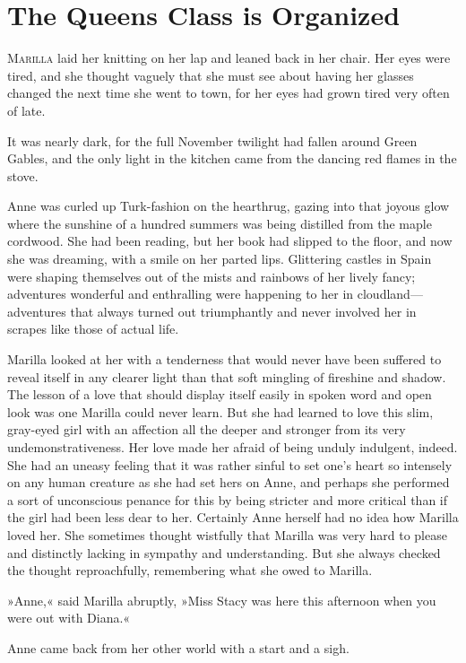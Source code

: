 \chapter{The Queens Class is Organized}

\lettrine[lines=4]{M}{arilla} laid her knitting on her lap and leaned back in her chair. Her eyes were tired, and she thought vaguely that she must see about having her glasses changed the next time she went to town, for her eyes had grown tired very often of late.

It was nearly dark, for the full November twilight had fallen around Green Gables, and the only light in the kitchen came from the dancing red flames in the stove.

Anne was curled up Turk-fashion on the hearthrug, gazing into that joyous glow where the sunshine of a hundred summers was being distilled from the maple cordwood. She had been reading, but her book had slipped to the floor, and now she was dreaming, with a smile on her parted lips. Glittering castles in Spain were shaping themselves out of the mists and rainbows of her lively fancy; adventures wonderful and enthralling were happening to her in cloudland—adventures that always turned out triumphantly and never involved her in scrapes like those of actual life.

Marilla looked at her with a tenderness that would never have been suffered to reveal itself in any clearer light than that soft mingling of fireshine and shadow. The lesson of a love that should display itself easily in spoken word and open look was one Marilla could never learn. But she had learned to love this slim, gray-eyed girl with an affection all the deeper and stronger from its very undemonstrativeness. Her love made her afraid of being unduly indulgent, indeed. She had an uneasy feeling that it was rather sinful to set one’s heart so intensely on any human creature as she had set hers on Anne, and perhaps she performed a sort of unconscious penance for this by being stricter and more critical than if the girl had been less dear to her. Certainly Anne herself had no idea how Marilla loved her. She sometimes thought wistfully that Marilla was very hard to please and distinctly lacking in sympathy and understanding. But she always checked the thought reproachfully, remembering what she owed to Marilla.

»Anne,« said Marilla abruptly, »Miss Stacy was here this afternoon when you were out with Diana.«

Anne came back from her other world with a start and a sigh.


